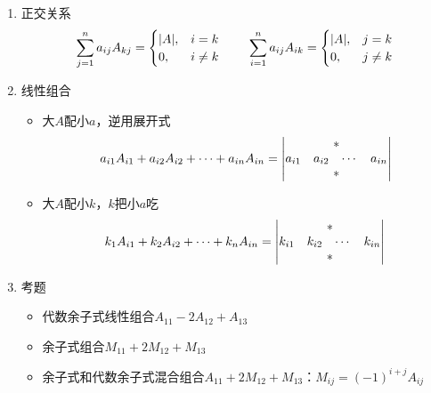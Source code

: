 \documentclass[./linear_algebra.tex]{subfiles}
\begin{document}
    \begin{enumerate}
        \item 正交关系
        \[
            \sum_{j=1}^{n}a_{ij}A_{kj}=
            \begin{cases}
                |A|, & i=k\\
                0,   & i\ne k
            \end{cases} \\ \qquad \sum_{i=1}^{n}a_{ij}A_{ik}=
            \begin{cases}
                |A|, & j=k\\
                0,   & j\ne k
            \end{cases}
        \]
        \item 线性组合
        \begin{itemize}
            \item 大$A$配小$a$，逆用展开式
            \[
                a_{i1}A_{i1}+a_{i2}A_{i2}+\cdots +a_{in}A_{in} = \begin{vmatrix}
                                                                     \multicolumn{4}{c}{*}\\
                                                                     a_{i1} & a_{i2} & \cdots & a_{in}\\
                                                                     \multicolumn{4}{c}{*}
                \end{vmatrix}
            \]
            \item 大$A$配小$k$，$k$把小$a$吃
            \[
                k_{1}A_{i1}+k_{2}A_{i2}+\cdots +k_{n}A_{in} = \begin{vmatrix}
                                                                  \multicolumn{4}{c}{*}\\
                                                                  k_{i1} & k_{i2} & \cdots & k_{in}\\
                                                                  \multicolumn{4}{c}{*}
                \end{vmatrix}
            \]
        \end{itemize}

        \item 考题
        \begin{itemize}
            \item 代数余子式线性组合$A_{11} - 2A_{12} + A_{13}$
            \item 余子式组合$M_{11} + 2M_{12} + M_{13}$
            \item 余子式和代数余子式混合组合$A_{11} + 2M_{12} + M_{13}$：$M_{ij} = (-1)^{i+j}A_{ij}$
        \end{itemize}
    \end{enumerate}
\end{document}
